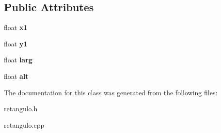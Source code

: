 \subsection*{Public Attributes}
\begin{DoxyCompactItemize}
\item 
\mbox{\label{classretangulo_addf35a5b55900206b425986c28174469}} 
float {\bfseries x1}
\item 
\mbox{\label{classretangulo_a37160bd3fb59f4c4c12525ac7b94678e}} 
float {\bfseries y1}
\item 
\mbox{\label{classretangulo_a977ab31fc5998d9e42c94f62a6c68b71}} 
float {\bfseries larg}
\item 
\mbox{\label{classretangulo_a72b730a7156f944fa3b1d4edff1cbe0d}} 
float {\bfseries alt}
\end{DoxyCompactItemize}


The documentation for this class was generated from the following files\+:\begin{DoxyCompactItemize}
\item 
retangulo.\+h\item 
retangulo.\+cpp\end{DoxyCompactItemize}
